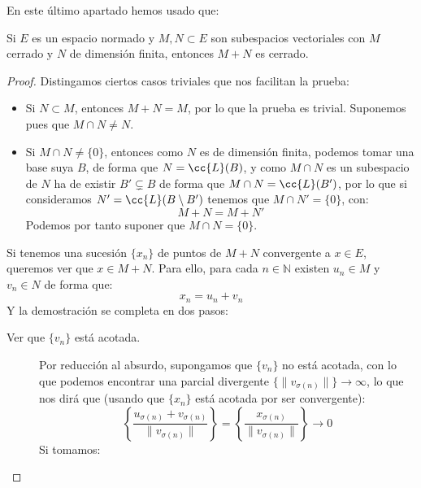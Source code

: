 \begin{ejercicio}
    En este último apartado hemos usado que:
    \begin{center}
        Si $E$ es un espacio normado y $M,N\subset E$ son subespacios vectoriales con $M$ cerrado y $N$ de dimensión finita, entonces $M+N$ es cerrado.
    \end{center}
    \begin{proof}
        Distingamos ciertos casos triviales que nos facilitan la prueba:
        \begin{itemize}
            \item Si $N\subset M$, entonces $M+ N = M$, por lo que la prueba es trivial. Suponemos pues que $M\cap N \neq N$.
            \item Si $M\cap N \neq \{0\}$, entonces como $N$ es de dimensión finita, podemos tomar una base suya $B$, de forma que $N = \cc{L}(B)$, y como $M\cap N$ es un subespacio de $N$ ha de existir $B'\subsetneq B$ de forma que $M\cap N = \cc{L}(B')$, por lo que si consideramos $N' = \cc{L}(B\setminus B')$ tenemos que $M\cap N' = \{0\}$, con:
                \begin{equation*}
                    M + N = M + N'
                \end{equation*}
                Podemos por tanto suponer que $M\cap N = \{0\}$.
        \end{itemize}
        Si tenemos una sucesión $\{x_n\}$ de puntos de $M+N$ convergente a $x\in E$, queremos ver que $x\in M+N$. Para ello, para cada $n\in \mathbb{N}$ existen $u_n\in M$ y $v_n\in N$ de forma que:
        \begin{equation*}
            x_n = u_n + v_n
        \end{equation*}
        Y la demostración se completa en dos pasos:
        \begin{description}
            \item [Ver que $\{v_n\}$ está acotada.]  Por reducción al absurdo, supongamos que $\{v_n\}$ no está acotada, con lo que podemos encontrar una parcial divergente \newline $\{\|v_{\sigma(n)}\|\}\to \infty$, lo que nos dirá que (usando que $\{x_n\}$ está acotada por ser convergente):
                \begin{equation*}
                    \left\{\frac{u_{\sigma(n)} + v_{\sigma(n)}}{\|v_{\sigma(n)}\|}\right\}= \left\{\frac{x_{\sigma(n)}}{\|v_{\sigma(n)}\|}\right\} \to 0
                \end{equation*}
                Si tomamos:
                \begin{equation*}

\end{equation*}
\end{description}
\end{proof}
\end{ejercicio}
